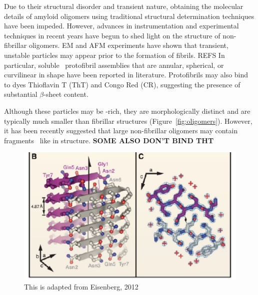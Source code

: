 Due to their structural disorder and transient nature, obtaining the molecular details of amyloid oligomers using traditional structural determination techniques have been impeded. However, advances in instrumentation and experimental techniques in recent years have begun to shed light on the structure of non-fibrillar oligomers. EM and AFM experiments have shown that transient, unstable particles may appear prior to the formation of fibrils. REFS
In particular, soluble \abeta\ protofibril assemblies that are annular, spherical, or curvilinear in shape have been reported in literature.\cite{Haass:2007db} Protofibrils may also bind to dyes Thioflavin T (ThT) and Congo Red (CR), suggesting the presence of substantial $\beta$-sheet content.\cite{Walsh:2007fu,Haass:2007db,Kodali:2007cz} 

Although these particles may be \bsheet-rich, they are morphologically distinct and are typically much smaller than fibrillar structures (Figure~\ref{fig:oligomers}).\cite{Walsh:2009p1235} However, it has been recently suggested that large non-fibrillar oligomers may contain fragments \crossb\ like in structure.\cite{Walsh:2010p4761,Stroud:2012dp,Chimon:2007du}  
\textbf{SOME ALSO DON'T BIND THT}


\begin{figure}
  \centering
  \includegraphics[width=6in]{figures/introduction/fibril_xray_model.pdf}
  \caption[Characteristic cross-$\beta$ spacings from X-ray fibre diffraction studies of amyloid fibrils]{This is adapted from Eisenberg, 2012}
  \label{fig:fibril_xray_model}
\end{figure}

